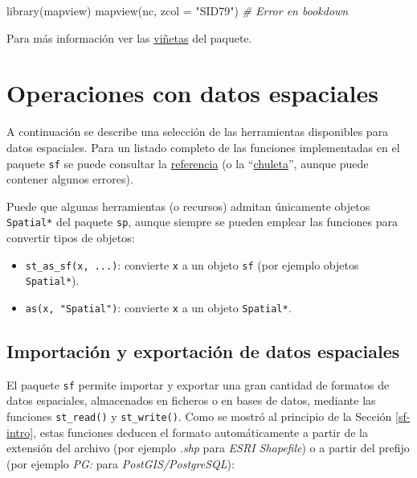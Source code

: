 \documentclass[
  spanish,
]{book}
\newenvironment{Shaded}{\begin{snugshade}}{\end{snugshade}}
\newcommand{\AttributeTok}[1]{\textcolor[rgb]{0.77,0.63,0.00}{#1}}
\newcommand{\CommentTok}[1]{\textcolor[rgb]{0.56,0.35,0.01}{\textit{#1}}}
\newcommand{\FunctionTok}[1]{\textcolor[rgb]{0.00,0.00,0.00}{#1}}
\newcommand{\NormalTok}[1]{#1}
\newcommand{\StringTok}[1]{\textcolor[rgb]{0.31,0.60,0.02}{#1}}
\providecommand{\tightlist}{%
  \setlength{\itemsep}{0pt}\setlength{\parskip}{0pt}}
\theoremstyle{break}
\theoremstyle{definition}
\theoremstyle{definition}
\theoremstyle{definition}
\theoremstyle{definition}
\theoremstyle{remark}
\begin{document}
\begin{Shaded}
\begin{Highlighting}[]
\FunctionTok{library}\NormalTok{(mapview)}
\FunctionTok{mapview}\NormalTok{(nc, }\AttributeTok{zcol =} \StringTok{"SID79"}\NormalTok{)}
\CommentTok{\# Error en bookdown}
\end{Highlighting}
\end{Shaded}

Para más información ver las \href{https://r-spatial.github.io/mapview/articles/articles/mapview_01-basics.html}{viñetas} del paquete.

\hypertarget{operaciones-datos}{%
\section{Operaciones con datos espaciales}\label{operaciones-datos}}

A continuación se describe una selección de las herramientas disponibles para datos espaciales.
Para un listado completo de las funciones implementadas en el paquete \texttt{sf} se puede consultar la \href{https://r-spatial.github.io/sf/reference/index.html}{referencia} (o la ``\href{https://github.com/rstudio/cheatsheets/blob/master/sf.pdf}{chuleta}'', aunque puede contener algunos errores).

Puede que algunas herramientas (o recursos) admitan únicamente objetos \texttt{Spatial*} del paquete \texttt{sp}, aunque siempre se pueden emplear las funciones para convertir tipos de objetos:

\begin{itemize}
\tightlist
\item
  \texttt{st\_as\_sf(x,\ ...)}: convierte \texttt{x} a un objeto \texttt{sf} (por ejemplo objetos \texttt{Spatial*}).
\item
  \texttt{as(x,\ "Spatial")}: convierte \texttt{x} a un objeto \texttt{Spatial*}.
\end{itemize}

\hypertarget{importaciuxf3n-y-exportaciuxf3n-de-datos-espaciales}{%
\subsection{Importación y exportación de datos espaciales}\label{importaciuxf3n-y-exportaciuxf3n-de-datos-espaciales}}

El paquete \texttt{sf} permite importar y exportar una gran cantidad de formatos de datos espaciales, almacenados en ficheros o en bases de datos, mediante las funciones \texttt{st\_read()} y \texttt{st\_write()}.
Como se mostró al principio de la Sección \ref{sf-intro}, estas funciones deducen el formato automáticamente a partir de la extensión del archivo (por ejemplo \emph{.shp} para \emph{ESRI Shapefile}) o a partir del prefijo (por ejemplo \emph{PG:} para \emph{PostGIS/PostgreSQL}):
\end{document}
